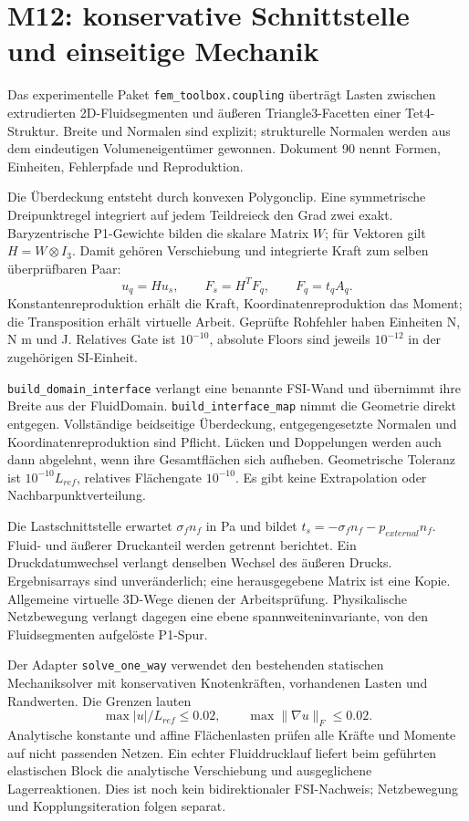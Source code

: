 \chapter[M12: Fluid-Struktur-Schnittstelle]{M12: konservative Schnittstelle und einseitige Mechanik}\label{api:fsi}
Das experimentelle Paket \texttt{fem\_toolbox.coupling} überträgt Lasten
zwischen extrudierten 2D-Fluidsegmenten und äußeren Triangle3-Facetten
einer Tet4-Struktur. Breite und Normalen sind explizit; strukturelle
Normalen werden aus dem eindeutigen Volumeneigentümer gewonnen.
Dokument 90 nennt Formen, Einheiten, Fehlerpfade und Reproduktion.

Die Überdeckung entsteht durch konvexen Polygonclip. Eine symmetrische
Dreipunktregel integriert auf jedem Teildreieck den Grad zwei exakt.
Baryzentrische P1-Gewichte bilden die skalare Matrix \(W\); für Vektoren
gilt \(H=W\otimes I_3\). Damit gehören Verschiebung und integrierte Kraft
zum selben überprüfbaren Paar:
\[
 u_q=H u_s,\qquad F_s=H^T F_q,\qquad F_q=t_q A_q.
\]
Konstantenreproduktion erhält die Kraft, Koordinatenreproduktion das Moment;
die Transposition erhält virtuelle Arbeit. Geprüfte Rohfehler haben Einheiten
N, N m und J. Relatives Gate ist \(10^{-10}\), absolute Floors sind jeweils
\(10^{-12}\) in der zugehörigen SI-Einheit.

\texttt{build\_domain\_interface} verlangt eine benannte FSI-Wand und übernimmt
ihre Breite aus der FluidDomain. \texttt{build\_interface\_map} nimmt die
Geometrie direkt entgegen. Vollständige beidseitige Überdeckung, entgegengesetzte
Normalen und Koordinatenreproduktion sind Pflicht. Lücken und Doppelungen
werden auch dann abgelehnt, wenn ihre Gesamtflächen sich aufheben.
Geometrische Toleranz ist \(10^{-10}L_{ref}\), relatives Flächengate
\(10^{-10}\). Es gibt keine Extrapolation oder Nachbarpunktverteilung.

Die Lastschnittstelle erwartet \(\sigma_f n_f\) in Pa und bildet
\(t_s=-\sigma_f n_f-p_{external}n_f\). Fluid- und äußerer Druckanteil
werden getrennt berichtet. Ein Druckdatumwechsel verlangt denselben Wechsel
des äußeren Drucks. Ergebnisarrays sind unveränderlich; eine herausgegebene
Matrix ist eine Kopie. Allgemeine virtuelle 3D-Wege dienen der Arbeitsprüfung.
Physikalische Netzbewegung verlangt dagegen eine ebene spannweiteninvariante,
von den Fluidsegmenten aufgelöste P1-Spur.

Der Adapter \texttt{solve\_one\_way} verwendet den bestehenden statischen
Mechaniksolver mit konservativen Knotenkräften, vorhandenen Lasten und
Randwerten. Die Grenzen lauten
\[
\max|u|/L_{ref}\leq0.02,\qquad \max\|\nabla u\|_F\leq0.02.
\]
Analytische konstante und affine Flächenlasten
prüfen alle Kräfte und Momente auf nicht passenden Netzen. Ein echter
Fluiddrucklauf liefert beim geführten elastischen Block die analytische
Verschiebung und ausgeglichene Lagerreaktionen. Dies ist noch kein
bidirektionaler FSI-Nachweis; Netzbewegung und Kopplungsiteration folgen separat.

